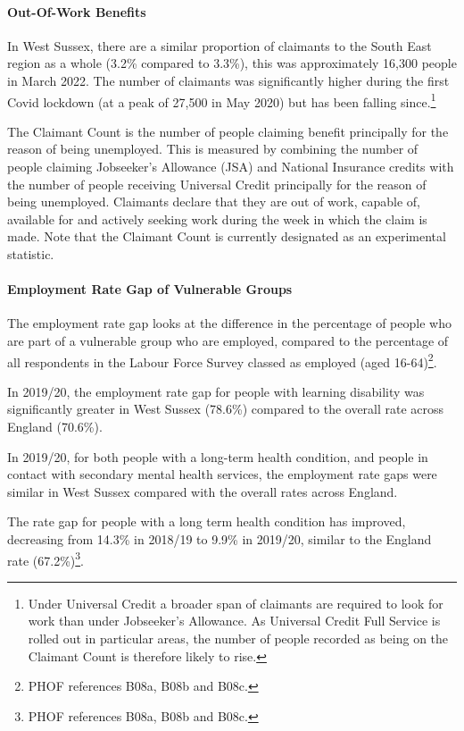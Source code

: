 \paragraph{Out-Of-Work Benefits} In West Sussex, there are a similar proportion of claimants to the South East region as a whole (3.2\% compared to 3.3\%), this was approximately 16,300 people in March 2022. The number of claimants was significantly higher during the first Covid lockdown (at a peak of 27,500 in May 2020) but has been falling since.\footnote{Under Universal Credit a broader span of claimants are required to look for work than under Jobseeker's Allowance. As Universal Credit Full Service is rolled out in particular areas, the number of people recorded as being on the Claimant Count is therefore likely to rise.}

The Claimant Count is the number of people claiming benefit principally for the reason of being unemployed. This is measured by combining the number of people claiming Jobseeker's Allowance (JSA) and National Insurance credits with the number of people receiving Universal Credit principally for the reason of being unemployed. Claimants declare that they are out of work, capable of, available for and actively seeking work during the week in which the claim is made. Note that the Claimant Count is currently designated as an experimental statistic.

\paragraph{Employment Rate Gap of Vulnerable Groups}

The employment rate gap looks at the difference in the percentage of people who are part of a vulnerable group who are employed, compared to the percentage of all respondents in the Labour Force Survey classed as employed (aged 16-64)\footnote{PHOF references B08a, B08b and B08c.}.

In 2019/20, the employment rate gap for people with learning disability was significantly greater in West Sussex (78.6\%) compared to the overall rate across England (70.6\%).

In 2019/20, for both people with a long-term health condition, and people in contact with secondary mental health services, the employment rate gaps were similar in West Sussex compared with the overall rates across England.

The rate gap for people with a long term health condition has improved, decreasing from 14.3\% in 2018/19 to 9.9\% in 2019/20, similar to the England rate (67.2\%)\footnote{PHOF references B08a, B08b and B08c.}.

